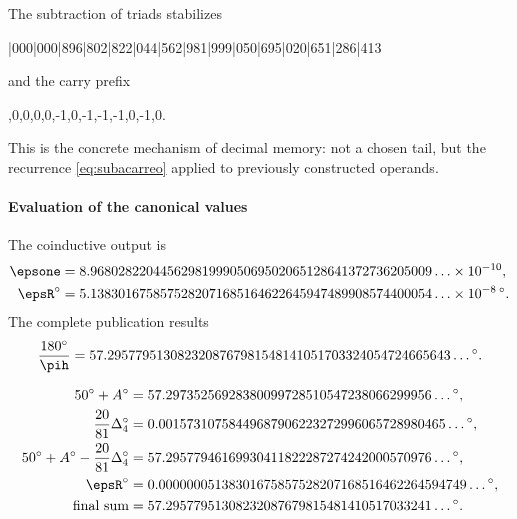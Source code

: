 The subtraction of triads stabilizes
\begin{center}
|000|000|896|802|822|044|562|981|999|050|695|020|651|286|413
\end{center}
and the carry prefix
\begin{center}
,0,0,0,0,-1,0,-1,-1,-1,0,-1,0.
\end{center}
This is the concrete mechanism of decimal memory: not a chosen tail, but
the recurrence \eqref{eq:subacarreo} applied to previously
constructed operands.

\paragraph{Evaluation of the canonical values}

The coinductive output is
\begin{align}
\epsone
&=8.9680282204456298199905069502065128641372736205009\ldots
\times10^{-10},\\
\epsR^\circ
&=5.1383016758575282071685164622645947489908574400054\ldots
\times10^{-8}\,{}^\circ.
\label{eq:epsilon-valores}
\end{align}
The complete publication results
\[
\frac{180^\circ}{\pih}
=57.2957795130823208767981548141051703324054724665643\ldots{}^\circ.
\]

\begin{exactbox}
\begin{align*}
50^\circ+A^\circ
&=57.29735256928380099728510547238066299956\ldots{}^\circ,\\
\frac{20}{81}\Delta_4^\circ
&=0.00157310758449687906223272996065728980465\ldots{}^\circ,\\
50^\circ+A^\circ-\frac{20}{81}\Delta_4^\circ
&=57.29577946169930411822287274242000570976\ldots{}^\circ,\\
\epsR^\circ
&=0.00000005138301675857528207168516462264594749\ldots{}^\circ,\\
\text{final sum}
&=57.29577951308232087679815481410517033241\ldots{}^\circ.
\end{align*}
\end{exactbox}

